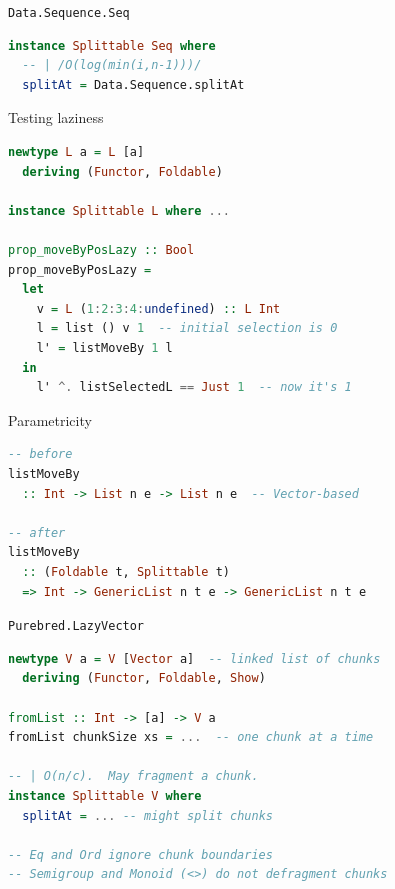 \documentclass[ignorenonframetext,aspectratio=169,dvipsnames]{beamer}
\begin{document}
\begin{frame}[fragile]{\tt Data.Sequence.Seq}
\begin{lstlisting}[language=Haskell]
instance Splittable Seq where
  -- | /O(log(min(i,n-1)))/
  splitAt = Data.Sequence.splitAt
\end{lstlisting}
\end{frame}

\begin{frame}[fragile]{Testing laziness}
\begin{lstlisting}[language=Haskell]
newtype L a = L [a]
  deriving (Functor, Foldable)

instance Splittable L where ...

prop_moveByPosLazy :: Bool
prop_moveByPosLazy =
  let
    v = L (1:2:3:4:undefined) :: L Int
    l = list () v 1  -- initial selection is 0
    l' = listMoveBy 1 l
  in
    l' ^. listSelectedL == Just 1  -- now it's 1
\end{lstlisting}
\end{frame}

\begin{frame}[fragile]{Parametricity}
\begin{lstlisting}[language=Haskell]
-- before
listMoveBy
  :: Int -> List n e -> List n e  -- Vector-based

-- after
listMoveBy
  :: (Foldable t, Splittable t)
  => Int -> GenericList n t e -> GenericList n t e
\end{lstlisting}
\end{frame}

%

\begin{frame}[plain]
\begin{center}
\def\svgwidth{0.2\textwidth}

\end{center}
\end{frame}

\begin{frame}[fragile]{\tt Purebred.LazyVector}
\begin{lstlisting}[language=Haskell]
newtype V a = V [Vector a]  -- linked list of chunks
  deriving (Functor, Foldable, Show)

fromList :: Int -> [a] -> V a
fromList chunkSize xs = ...  -- one chunk at a time

-- | O(n/c).  May fragment a chunk.
instance Splittable V where
  splitAt = ... -- might split chunks

-- Eq and Ord ignore chunk boundaries
-- Semigroup and Monoid (<>) do not defragment chunks
\end{lstlisting}
\end{frame}
\end{document}
